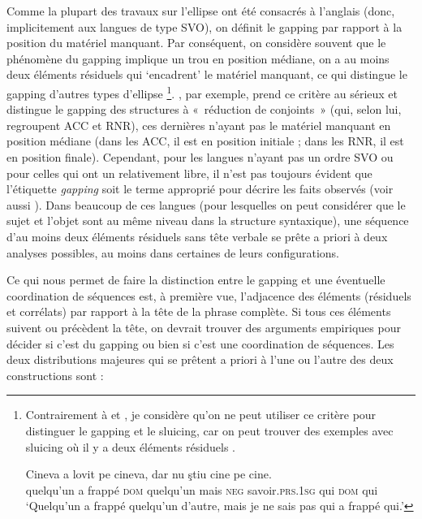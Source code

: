 Comme la plupart des travaux sur l’ellipse ont été consacrés à l’anglais (donc, implicitement aux langues de type SVO), on définit le gapping par rapport à la position du matériel manquant. Par conséquent, on considère souvent que le phénomène du gapping implique un trou en position médiane, {\cad} on a au moins deux éléments résiduels qui ‘encadrent’ le matériel manquant, ce qui distingue le gapping d’autres types d’ellipse \citep{Jackendoff1971,Lobeck1995}\footnote{Contrairement à \citet{Jackendoff1971} et \citet{Lobeck1995}, je considère qu’on ne peut utiliser ce critère pour distinguer le gapping et le sluicing, car on peut trouver des exemples avec sluicing où il y a deux éléments résiduels .
 
\ea \label{ch2:foot7:exi}
\gll Cineva  a  lovit  pe  cineva,  dar  nu  ştiu  cine  pe  cine.\\
quelqu’un  a  frappé \textsc{dom} quelqu’un  mais  \textsc{neg}  savoir.\textsc{prs.1sg}  qui  \textsc{dom}  qui\\
\glt ‘Quelqu’un a frappé quelqu’un d’autre, mais je ne sais pas qui a frappé qui.’
\z
}. \citet{Jackendoff1971}, par exemple, prend ce critère au sérieux et distingue le gapping des structures à «~réduction de conjoints~» (qui, selon lui, regroupent ACC et RNR), ces dernières n’ayant pas le matériel manquant en position médiane (dans les ACC, il est en position initiale ; dans les RNR, il est en position finale). Cependant, pour les langues n’ayant pas un ordre SVO ou pour celles qui ont un  relativement libre, il n’est pas toujours évident que l’étiquette \textit{gapping} soit le terme approprié pour décrire les faits observés (voir aussi \citealt{Haspelmath2007}). Dans beaucoup de ces langues (pour lesquelles on peut considérer que le sujet et l’objet sont au même niveau dans la structure syntaxique), une séquence d’au moins deux éléments résiduels sans tête verbale se prête a priori à deux analyses possibles, au moins dans certaines de leurs configurations. 

Ce qui nous permet de faire la distinction entre le gapping et une éventuelle coordination de séquences est, à première vue, l’adjacence des éléments (résiduels et corrélats) par rapport à la tête de la phrase complète. Si tous ces éléments suivent ou précèdent la tête, on devrait trouver des arguments empiriques pour décider si c’est du gapping ou bien si c’est une coordination de séquences. Les deux distributions majeures qui se prêtent a priori à l’une ou l’autre des deux constructions sont :

